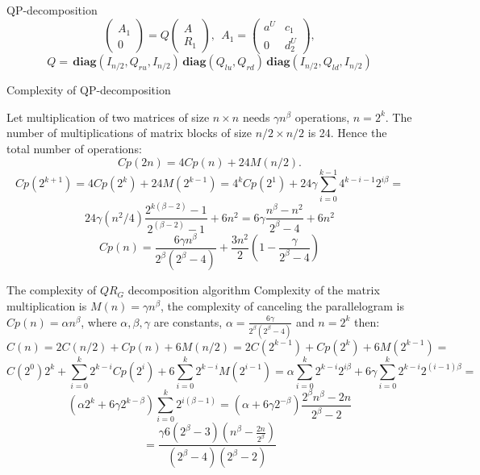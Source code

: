 \documentclass[pdf]{beamer}
\begin{document}
\begin{frame}{ QP-decomposition}
%
 $$ \left(\begin{array}{c}A_{1}  \\ 0 \end{array}\right) = Q  \left(\begin{array}{c}A  \\ R_{1}  \end{array}\right) ,\ \ A_{1}= \left(\begin{array}{cc}a^U & c_{1} \\ 0 & d_{2}^U \end{array}\right) , $$
%
 $$Q=\, \mathbf{diag}(I_{n/2}, Q_{ru}, I_{n/2} )\, \mathbf{diag}(Q_{lu}  ,Q_{rd} ) \, 
\mathbf{diag}(I_{n/2},Q_{ld} ,I_{n/2})$$
\end{frame}


\begin{frame}{Complexity of QP-decomposition}
 
 Let multiplication of two matrices of size $ n \times n $  needs $ \gamma n ^ \beta $ operations, 
 $ n = 2 ^ k $.
  The number of multiplications of matrix blocks of size $ n / 2 \times n / 2 $ is 24. Hence the total number of operations: $$ Cp (2n) = 4Cp (n) + 24M (n / 2). $$  
 $$ Cp(2^{k+1}) = 4 Cp(2^{k}) + 24 M(2^{k-1})=4^{k }Cp(2^1) 
 +24\gamma\sum_{i=0}^{k-1} 4^{k-i-1}  2^{i\beta}= $$ 
$$24 \gamma (n^2/4)\frac{2^{k(\beta-2) }-1}{2^{(\beta-2)}-1}+6n^2 =
6 \gamma  \frac{n^{\beta }-n^2}{2^{\beta }-4}+6n^2$$ 
    $$ Cp(n)  =  \frac{6 \gamma n^{\beta } }{2^\beta(2^{\beta}-4)}+ \frac{3n^2 }{2}(1- \frac{ \gamma  }{  2^{\beta}-4 })$$ 
\end{frame}

\begin{frame}{The complexity of  $ QR_G $ decomposition algorithm}
%
Complexity of the matrix multiplication is $ M (n) = \gamma n ^ \beta $,
the complexity of canceling the parallelogram is $ Cp (n) = \alpha n ^ \beta $, where $ \alpha, \beta, \gamma $ are constants,
  $\alpha= \frac{6 \gamma }{2^\beta(2^{\beta}-4)}$ and $n=2^k$  then:
%
  $$C (n)=2C (n/2) + Cp(n) + 6M(n/2)=2C (2^{k-1}) + Cp(2^{k}) + 6M(2^{k-1})= $$
%
 $$  C(2^0) 2^{k}  + \sum_{i=0}^{k} 2^{k-i}Cp(2^{i}) + 6\sum_{i=0}^{k} 2^{k-i} M(2^{i-1})=     \alpha \sum_{i=0}^{k} 2^{k-i} 2^{i\beta} + 6\gamma\sum_{i=0}^{k} 2^{k-i} 2^{(i-1)\beta}= 
 $$ $$
 (\alpha 2^{k} + 6\gamma 2^{k-\beta}) \sum_{i=0}^{k}   2^{i(\beta-1)}=(\alpha   +  6\gamma 2^{-\beta})\frac{2^{\beta }n^{\beta }-2n}{2^{\beta  }-2}$$ 
 $$
 =  \frac{\gamma 6 (2^{\beta  }-3)( n^{\beta }-\frac{2n}{2^\beta} )}{ (2^{\beta}-4)(2^{\beta  }-2)} $$
\end{frame}
\end{document}
